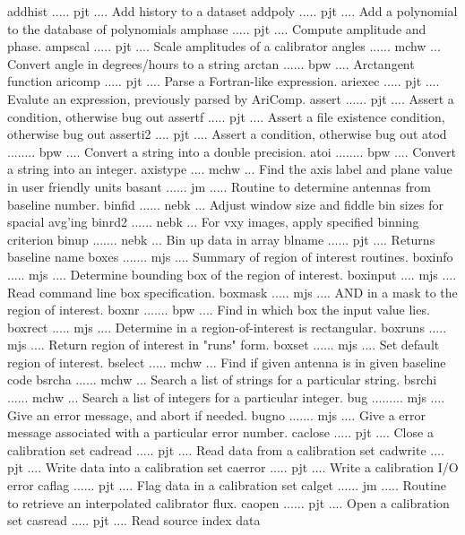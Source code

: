 {\eightpoint\begintt
addhist ..... pjt .... Add history to a dataset 
addpoly ..... pjt .... Add a polynomial to the database of polynomials 
amphase ..... pjt .... Compute amplitude and phase. 
ampscal ..... pjt .... Scale amplitudes of a calibrator 
angles ...... mchw ... Convert angle in degrees/hours to a string 
\endtt}
{\eightpoint\begintt
arctan ...... bpw .... Arctangent function 
aricomp ..... pjt .... Parse a Fortran-like expression. 
ariexec ..... pjt .... Evalute an expression, previously parsed by AriComp. 
assert ...... pjt .... Assert a condition, otherwise bug out 
assertf ..... pjt .... Assert a file existence condition, otherwise bug out 
\endtt}
{\eightpoint\begintt
asserti2 .... pjt .... Assert a condition, otherwise bug out 
atod ........ bpw .... Convert a string into a double precision. 
atoi ........ bpw .... Convert a string into an integer. 
axistype .... mchw ... Find the axis label and plane value in user friendly units 
basant ...... jm ..... Routine to determine antennas from baseline number. 
\endtt}
{\eightpoint\begintt
binfid ...... nebk ... Adjust window size and fiddle bin sizes for spacial avg'ing 
binrd2 ...... nebk ... For vxy images, apply specified binning criterion 
binup ....... nebk ... Bin up data in array 
blname ...... pjt .... Returns baseline name 
boxes ....... mjs .... Summary of region of interest routines. 
\endtt}
{\eightpoint\begintt
boxinfo ..... mjs .... Determine bounding box of the region of interest. 
boxinput .... mjs .... Read command line box specification. 
boxmask ..... mjs .... AND in a mask to the region of interest. 
boxnr ....... bpw .... Find in which box the input value lies. 
boxrect ..... mjs .... Determine in a region-of-interest is rectangular. 
\endtt}
{\eightpoint\begintt
boxruns ..... mjs .... Return region of interest in "runs" form. 
boxset ...... mjs .... Set default region of interest. 
bselect ..... mchw ... Find if given antenna is in given baseline code 
bsrcha ...... mchw ... Search a list of strings for a particular string. 
bsrchi ...... mchw ... Search a list of integers for a particular integer. 
\endtt}
{\eightpoint\begintt
bug ......... mjs .... Give an error message, and abort if needed. 
bugno ....... mjs .... Give a error message associated with a particular error number. 
caclose ..... pjt .... Close a calibration set 
cadread ..... pjt .... Read data from a calibration set 
cadwrite .... pjt .... Write data into a calibration set 
\endtt}
{\eightpoint\begintt
caerror ..... pjt .... Write a calibration I/O error 
caflag ...... pjt .... Flag data in a calibration set 
calget ...... jm ..... Routine to retrieve an interpolated calibrator flux. 
caopen ...... pjt .... Open a calibration set 
casread ..... pjt .... Read source index data 
\endtt}
